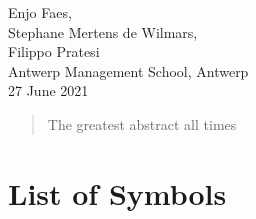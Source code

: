 \documentclass[a4paper, twoside]{templates/ociamthesis}
\begin{document}
\begin{romanpages}
\begin{acknowledgements}
  \begin{flushright}
  Enjo Faes, \\
  Stephane Mertens de Wilmars, \\
  Filippo Pratesi \\
  Antwerp Management School, Antwerp \\
  27 June 2021
  \end{flushright}
\end{acknowledgements}


\begin{abstract}
	The greatest abstract all times
\end{abstract}


\flushbottom

\tableofcontents

\listoffigures
	\mtcaddchapter

\listoftables
  \mtcaddchapter


\end{romanpages}

\flushbottom

\hypertarget{list-of-symbols}{%
\chapter*{List of Symbols}\label{list-of-symbols}}
\end{document}
